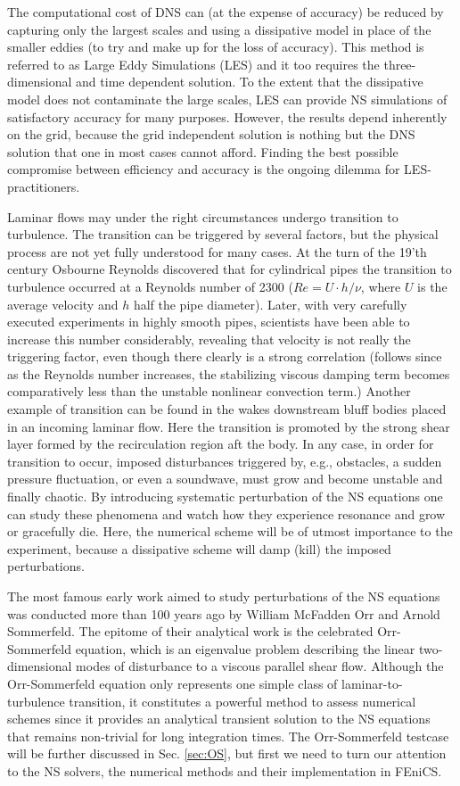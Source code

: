 The computational cost of DNS can (at the expense of accuracy) be
reduced by capturing only the largest scales and using a dissipative
model in place of the smaller eddies (to try and make up for the loss
of accuracy). This method is referred to as Large Eddy Simulations
(LES) and it too requires the three-dimensional and time dependent
solution. To the extent that the dissipative model does not
contaminate the large scales, LES can provide NS simulations of
satisfactory accuracy for many purposes. However, the results depend
inherently on the grid, because the grid independent solution is
nothing but the DNS solution that one in most cases cannot
afford. Finding the best possible compromise between efficiency and
accuracy is the ongoing dilemma for LES-practitioners.

Laminar flows may under the right circumstances undergo transition to
turbulence. The transition can be triggered by several factors, but
the physical process are not yet fully understood for many cases. At
the turn of the 19'th century Osbourne Reynolds discovered that for
cylindrical pipes the transition to turbulence occurred at a Reynolds
number of 2300 ($Re=U\cdot h/\nu$, where $U$ is the average velocity
and $h$ half the pipe diameter). Later, with very carefully executed
experiments in highly smooth pipes, scientists have been able to
increase this number considerably, revealing that velocity is not
really the triggering factor, even though there clearly is a strong
correlation (follows since as the Reynolds number increases, the
stabilizing viscous damping term becomes comparatively less than the
unstable nonlinear convection term.) Another example of transition can
be found in the wakes downstream bluff bodies placed in an incoming
laminar flow. Here the transition is promoted by the strong shear
layer formed by the recirculation region aft the body. In any case, in
order for transition to occur, imposed disturbances triggered by,
e.g., obstacles, a sudden pressure fluctuation, or even a soundwave,
must grow and become unstable and finally chaotic. By introducing
systematic perturbation of the NS equations one can study these
phenomena and watch how they experience resonance and grow or
gracefully die. Here, the numerical scheme will be of utmost
importance to the experiment, because a dissipative scheme will damp
(kill) the imposed perturbations.

The most famous early work aimed to study perturbations of the NS
equations was conducted more than 100 years ago by William McFadden
Orr and Arnold Sommerfeld. The epitome of their analytical work is the
celebrated Orr-Sommerfeld equation, which is an eigenvalue problem
describing the linear two-dimensional modes of disturbance to a
viscous parallel shear flow. Although the Orr-Sommerfeld equation only
represents one simple class of laminar-to-turbulence transition, it
constitutes a powerful method to assess numerical schemes since it
provides an analytical transient solution to the NS equations that
remains non-trivial for long integration times. The Orr-Sommerfeld
testcase will be further discussed in Sec. \ref{sec:OS}, but first we
need to turn our attention to the NS solvers, the numerical methods
and their implementation in FEniCS.


